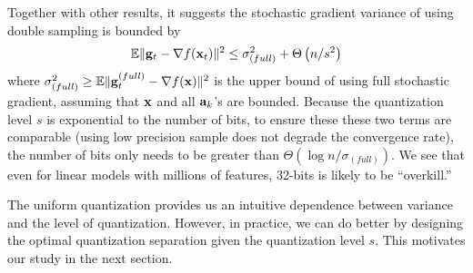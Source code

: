 \vspace{-1em}
Together with other results, it suggests the stochastic gradient variance of using double sampling is bounded by
\[
\mathbb{E}\|{\bf g}_t - \nabla f({\bf x}_t)\|^2 \leq \sigma^2_{(full)} + \Theta \left( {n /s^2} \right)
\]
where $\sigma^2_{(full)} \geq \mathbb{E} \|{\bf g}_t^{(full)} - \nabla f({\bf x})\|^2$ is the upper bound of using full stochastic gradient, assuming that ${\bf x}$ and all ${\bf a}_k$'s are bounded. Because the quantization level $s$ is exponential to the number of bits, to ensure these these two terms are comparable (using low precision sample does not degrade the convergence rate), the number of bits only needs to be greater than $\Theta (\log n /\sigma_{(full)})$. We see that even for linear models with millions
of features, 32-bits is likely to be  ``overkill.''

The uniform quantization provides us an intuitive dependence between variance and the level of quantization. However, in practice, we can do better by designing the optimal quantization separation given the quantization level $s$. This motivates
our study in the next section.
 

